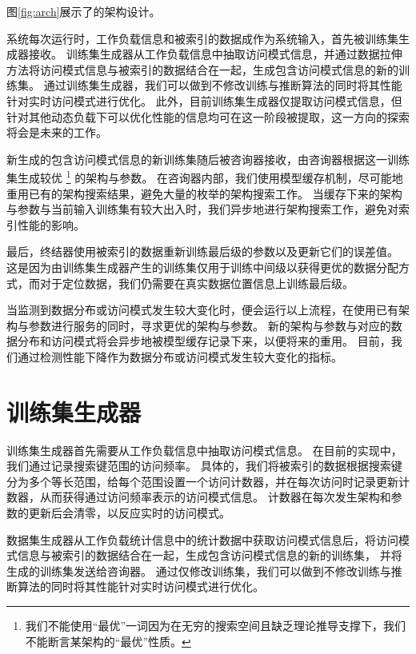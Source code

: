 图\ref{fig:arch}展示了{\sys}的架构设计。

系统每次运行时，工作负载信息和被索引的数据成作为系统输入，首先被训练集生成器接收。
训练集生成器从工作负载信息中抽取访问模式信息，并通过数据拉伸方法将访问模式信息与被索引的数据结合在一起，生成包含访问模式信息的新的训练集。
通过训练集生成器，我们可以做到不修改{\rmi}训练与推断算法的同时将其性能针对实时访问模式进行优化。
此外，目前训练集生成器仅提取访问模式信息，但针对其他动态负载下可以优化{\li}性能的信息均可在这一阶段被提取，这一方向的探索将会是未来的工作。

新生成的包含访问模式信息的新训练集随后被咨询器接收，由咨询器根据这一训练集生成较优
\footnote{我们不能使用“最优”一词因为在无穷的搜索空间且缺乏理论推导支撑下，我们不能断言某{\rmi}架构的“最优”性质。}
的{\rmi}架构与参数。
在咨询器内部，我们使用模型缓存机制，尽可能地重用已有的架构搜索结果，避免大量的枚举的架构搜索工作。
当缓存下来的{\rmi}架构与参数与当前输入训练集有较大出入时，我们异步地进行架构搜索工作，避免对索引性能的影响。

最后，终结器使用被索引的数据重新训练{\rmi}最后级{\model}的参数以及更新它们的误差值。
这是因为由训练集生成器产生的训练集仅用于训练中间级{\model}以获得更优的数据分配方式，而对于定位数据，我们仍需要在真实数据位置信息上训练最后级{\model}。

当{\sys}监测到数据分布或访问模式发生较大变化时，便会运行以上流程，在使用已有{\rmi}架构与参数进行服务的同时，寻求更优的{\rmi}架构与参数。
新的{\rmi}架构与参数与对应的数据分布和访问模式将会异步地被模型缓存记录下来，以便将来的重用。
目前，我们通过检测{\li}性能下降作为数据分布或访问模式发生较大变化的指标。

\section{训练集生成器}

训练集生成器首先需要从工作负载信息中抽取访问模式信息。
在目前的实现中，我们通过记录搜索键范围的访问频率。
具体的，我们将被索引的数据根据搜索键分为多个等长范围，给每个范围设置一个访问计数器，并在每次访问时记录更新计数器，从而获得通过访问频率表示的访问模式信息。
计数器在每次发生{\rmi}架构和参数的更新后会清零，以反应实时的访问模式。

数据集生成器从工作负载统计信息中的统计数据中获取访问模式信息后，将访问模式信息与被索引的数据结合在一起，生成包含访问模式信息的新的训练集，
并将生成的训练集发送给咨询器。
通过仅修改训练集，我们可以做到不修改{\rmi}训练与推断算法的同时将其性能针对实时访问模式进行优化。


